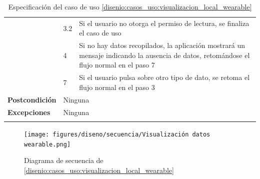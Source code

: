 \begin{table}[h]
\begin{tabularx}{\textwidth}{|l|l|X|}
                    \cline{2-3} & 3.2 & Si el usuario no otorga el permiso de lectura, se finaliza el caso de uso \\
                    \cline{2-3} & 4 & Si no hay datos recopilados, la aplicación mostrará un mensaje indicando la ausencia de datos, retomándose el flujo normal en el paso 7 \\
                    \cline{2-3} & 7 & Si el usuario pulsa sobre otro tipo de dato, se retoma el flujo normal en el paso 3 \\
                    \hline
                    \textbf{Postcondición} & \multicolumn{2}{|X|}{Ninguna} \\
                    \hline
                    \textbf{Excepciones} & \multicolumn{2}{|X|}{Ninguna} \\
                    \hline
                    \caption{Especificación del caso de uso \ref{disenio:casos_uso:visualizacion_local_wearable}}
                    \label{tabla:casos_uso:visualizacion_local_wearable}
                \end{tabularx}
            \end{table}

            \begin{figure}[h]
                \centering
                \texttt{[image: figures/diseno/secuencia/Visualización datos wearable.png]}
                \caption{Diagrama de secuencia de \ref{disenio:casos_uso:visualizacion_local_wearable}}
                \label{figure:diagrama_secuencia:visualizacion_local_wearable}
            \end{figure}
            
